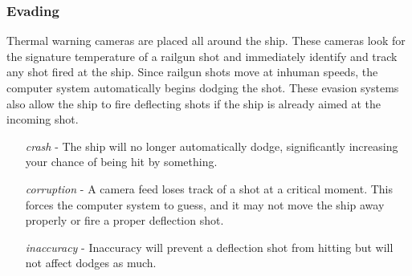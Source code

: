 \documentclass[a4paper]{article}
\begin{document}
\vspace{-0.5cm} \hspace{-18pt} \subsubsection{Evading} \label{fighter_evading} \vspace{-0.2cm}
Thermal warning cameras are placed all around the ship. These cameras look for the signature temperature of a railgun shot and immediately identify and track any shot fired at the ship. Since railgun shots move at inhuman speeds, the computer system automatically begins dodging the shot. These evasion systems also allow the ship to fire deflecting shots if the ship is already aimed at the incoming shot.
\begin{enumerate}[leftmargin=2cm]
\item [\textit{crash}] - The ship will no longer automatically dodge, significantly increasing your chance of being hit by something.
\item [\textit{corruption}] - A camera feed loses track of a shot at a critical moment. This forces the computer system to guess, and it may not move the ship away properly or fire a proper deflection shot.
\item [\textit{inaccuracy}] - Inaccuracy will prevent a deflection shot from hitting but will not affect dodges as much.
\end{enumerate}
\end{document}
